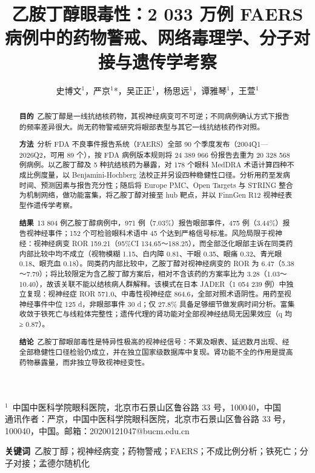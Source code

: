 \documentclass[UTF8,fontset=windows,11pt]{ctexart}
\title{乙胺丁醇眼毒性：2 033 万例 FAERS 病例中的药物警戒、网络毒理学、分子对接与遗传学考察}
\author{史博文$^{1}$，严京$^{1}$*，吴正正$^{1}$，杨思远$^{1}$，谭雅琴$^{1}$，王萱$^{1}$}
\date{}
\begin{document}
\maketitle

\begin{center}\small
$^{1}$\ 中国中医科学院眼科医院，北京市石景山区鲁谷路 33 号，100040，中国\\
通讯作者：严京，中国中医科学院眼科医院，北京市石景山区鲁谷路 33 号，100040，中国。邮箱：20200121047@bucm.edu.cn
\end{center}
\vspace{1.2em}

\begin{abstract}
\textbf{目的}\ 乙胺丁醇是一线抗结核药物，其视神经病变可不可逆；不同病例确认方式下报告的频率差异很大。尚无药物警戒研究将眼部表型与其它一线抗结核药作对照。

\textbf{方法}\ 分析 FDA 不良事件报告系统（FAERS）全部 90 个季度发布（2004Q1—2026Q2，可用 89 个），按 FDA 病例版本规则将 24 389 966 份报告去重为 20 328 568 例病例。以乙胺丁醇及 5 种抗结核药为暴露，对 178 个眼科 MedDRA 术语计算四种不成比例度量，以 Benjamini-Hochberg 法校正并另设四种稳健性口径。分析用药至发病时间、预测因素与报告充分性；随后将 Europe PMC、Open Targets 与 STRING 整合为机制网络，做功能富集，将乙胺丁醇对接至 hub 靶点，并以 FinnGen R12 视神经表型作遗传学考察。

\textbf{结果}\ 13 804 例乙胺丁醇病例中，971 例（7.03\%）报告眼部事件，475 例（3.44\%）报告视神经事件；152 个可检验眼科术语中 45 个达到严格信号标准。风险局限于视神经：视神经病变 ROR 159.21（95\%CI 134.65～188.25），而全部泛化眼部主诉在同类药内部比较中均不成立（视物模糊 1.15、白内障 0.81、干眼 0.35、眼痛 0.32、青光眼 0.18、眼充血 0.18）。同类药内部比较中，乙胺丁醇对视神经病变的 ROR 为 6.47（5.38～7.79）；将比较限定为含乙胺丁醇方案后，相对不含该药的方案率比为 3.28（1.03～10.40），故该关联不能以结核病人群解释。该模式在日本 JADER（1 054 239 例）中独立复现：视神经症 ROR 571.0、中毒性视神经症 864.6，全部对照术语阴性。用药至视神经事件中位 125 d，非眼部事件 30 d；仅 27.8\% 具备足够细节做发病时间分析。富集收敛于铁死亡与线粒体完整性；遗传代理的肾功能对全部视神经结局无因果效应（q 均 ≥ 0.87）。

\textbf{结论}\ 乙胺丁醇眼部毒性是特异性极高的视神经信号：不累及眼表、延迟数月出现、经全部稳健性口径检验仍成立，并在独立国家级数据库中复现。肾功能不全的作用是提高药物暴露量，而非独立导致视神经变性。

\end{abstract}

\noindent \textbf{关键词}\ 乙胺丁醇；视神经病变；药物警戒；FAERS；不成比例分析；铁死亡；分子对接；孟德尔随机化
\end{document}
